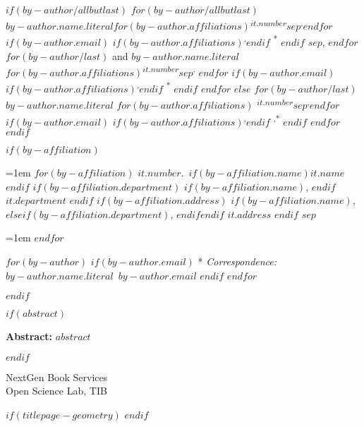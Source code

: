 \begin{tcolorbox}

$if(by-author/allbutlast)$
  \noindent\ignorespaces%
  $for(by-author/allbutlast)$
    {\large{$by-author.name.literal$}}$for(by-author.affiliations)${\textsuperscript{$it.number$}}$sep$\textsuperscript{,}$endfor$%
  $if(by-author.email)$%
  $if(by-author.affiliations)$\textsuperscript{,}$endif$%
  {\textsuperscript{*}}%
  $endif$%
  $sep$, 
  $endfor$
  $for(by-author/last)$%
    { and \large{$by-author.name.literal$}}%
  $for(by-author.affiliations)${\textsuperscript{$it.number$}}$sep$\textsuperscript{,}%
  $endfor$%
  $if(by-author.email)$%
    $if(by-author.affiliations)$\textsuperscript{,}$endif$%
    {\textsuperscript{*}}%
  $endif$%
  $endfor$
  $else$
  \noindent\ignorespaces%
  $for(by-author/last)$%
    {\large{$by-author.name.literal$}}%
    $for(by-author.affiliations)$%
    {\textsuperscript{$it.number$}}$sep$\textsuperscript{,}$endfor$%
  $if(by-author.email)$%
    $if(by-author.affiliations)$\textsuperscript{,}$endif$%
    {\textsuperscript{,*}}%
$endif$%
$endfor$
$endif$

$if(by-affiliation)$
\vspace{2\baselineskip} 

\hangindent=1em
$for(by-affiliation)$%
{$it.number$}.~$if(by-affiliation.name)${$it.name$}$endif$%
$if(by-affiliation.department)$%
$if(by-affiliation.name)$, $endif$%
{$it.department$}%
$endif$%
$if(by-affiliation.address)$%
$if(by-affiliation.name)$, $else$$if(by-affiliation.department)$, $endif$$endif$%
{$it.address$}%
$endif$%
$sep$\par\hangindent=1em%
$endfor$

\vspace{1\baselineskip} 

$for(by-author)$
$if(by-author.email)$
* \textit{Correspondence:}~$by-author.name.literal$~$by-author.email$\newline
$endif$
$endfor$

$endif$
\end{tcolorbox}

$if(abstract)$
\begin{tcolorbox}

  \textbf{Abstract:\newline}
  $abstract$

\end{tcolorbox}
$endif$


\vfill

\vspace{1\baselineskip} 

\begin{tcolorbox}
\centering

{
  NextGen Book Services\\
  Open Science Lab, TIB
}
\end{tcolorbox}

$if(titlepage-geometry)$
  \restoregeometry
$endif$

